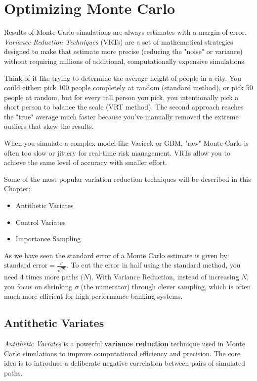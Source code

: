 \chapter{Optimizing Monte Carlo}
\label{cap:variation_reduction}

Results of Monte Carlo simulations are always estimates with a margin of error. \emph{Variance Reduction Techniques} (VRTs) are a set of
mathematical strategies designed to make that estimate more precise (reducing the "noise" or variance) without requiring millions of additional, computationally expensive simulations.
	
Think of it like trying to determine the average height of people in a city. You could either: pick 100 people completely at random (standard method), or pick 50 people at random, 
but for every tall person you pick, you intentionally pick a short person to balance the scale (VRT method). The second approach reaches the "true" average much faster because
you've manually removed the extreme outliers that skew the results.
	
When you simulate a complex model like Vasicek or GBM, "raw" Monte Carlo is often too slow or jittery for real-time risk management. VRTs  allow you to achieve the same level of accuracy with smaller effort.

Some of the most popular variation reduction techniques will be described in this Chapter:
	
\begin{itemize}
	\tightlist
	\item Antithetic Variates
	\item Control Variates
	\item Importance Sampling
\end{itemize}
	
As we have seen the standard error of a Monte Carlo estimate is given by: $\text{standard error} = \frac{\sigma}{\sqrt{N}}$. To cut the error in half using the standard method, you need 4 times
more paths ($N$). With Variance Reduction, instead of increasing $N$, you focus on shrinking $\sigma$ (the numerator) through clever sampling, which is often much more efficient for high-performance
banking systems.
	
\section{Antithetic Variates}
\label{sec:monte-carlo-with-antithetic-variates}
	
\emph{Antithetic Variates} is a powerful \textbf{variance reduction} technique used in Monte Carlo simulations to improve computational efficiency and precision. The core idea is to introduce a deliberate
negative correlation between pairs of simulated paths. 

